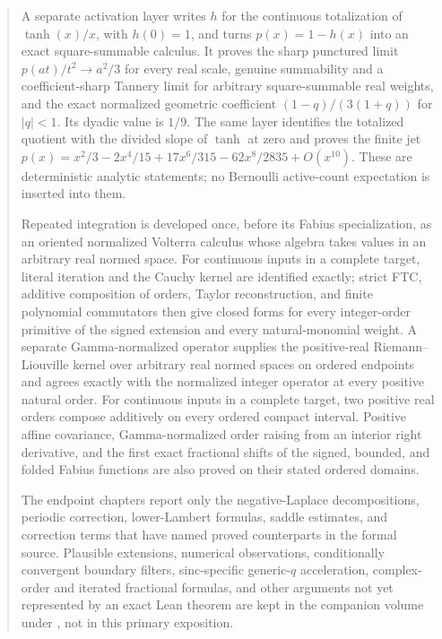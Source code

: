 \documentclass[11pt,oneside]{article}
\theoremstyle{definition}
\theoremstyle{remark}
\begin{document}
\begin{abstract}
A separate activation layer writes \(h\) for the continuous totalization of
\(\tanh(x)/x\), with \(h(0)=1\), and turns \(p(x)=1-h(x)\) into an exact
square-summable calculus.  It proves the sharp
punctured limit \(p(at)/t^2\to a^2/3\) for every real scale, genuine summability and a
coefficient-sharp Tannery limit for arbitrary square-summable real weights, and the exact
normalized geometric coefficient \((1-q)/(3(1+q))\) for \(\lvert q\rvert<1\).  Its dyadic
value is \(1/9\).  The same layer identifies the totalized quotient with the divided slope
of \(\tanh\) at zero and proves the finite jet
\(p(x)=x^2/3-2x^4/15+17x^6/315-62x^8/2835+O(x^{10})\).
These are deterministic analytic statements; no Bernoulli active-count expectation is
inserted into them.

Repeated integration is developed once, before its Fabius specialization, as an oriented
normalized Volterra calculus whose algebra takes values in an arbitrary real normed space.
For continuous inputs in a complete target, literal iteration and the Cauchy kernel are
identified exactly; strict FTC, additive composition of orders, Taylor reconstruction, and
finite polynomial commutators then give closed forms for every integer-order primitive of
the signed extension and every natural-monomial weight.  A separate Gamma-normalized
operator supplies the positive-real Riemann--Liouville kernel over arbitrary real normed
spaces on ordered endpoints and agrees exactly with the normalized integer operator at
every positive natural order.  For continuous inputs in a complete target, two positive
real orders compose additively on every ordered compact interval.  Positive affine
covariance, Gamma-normalized order raising from an interior right derivative, and the first
exact fractional shifts of the signed, bounded, and folded Fabius functions are also proved
on their stated ordered domains.

The endpoint chapters report only the negative-Laplace decompositions, periodic correction,
lower-Lambert formulas, saddle estimates, and correction terms that have named proved
counterparts in the formal source.  Plausible extensions, numerical observations,
conditionally convergent boundary filters, sinc-specific generic-$q$ acceleration,
complex-order and iterated fractional formulas, and other arguments not yet represented by
an exact Lean theorem are kept in the companion volume under
, not in this primary exposition.
\end{abstract}
\end{document}
